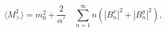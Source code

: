 \begin{equation}
\langle M^2_> \rangle = m^2_0 + \frac{2}{\alpha' } \quad \sum^\infty _{n=1} 
n(\left| B^x_n \right| ^2 + \left| B^y_n \right| ^2 ), 
\end{equation}

